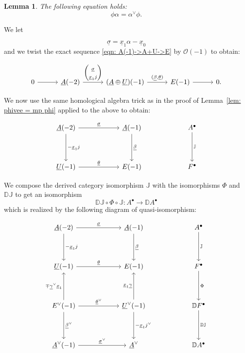 \documentclass{amsart}
\newtheorem{lemma}[theorem]{Lemma}
\theoremstyle{definition}
\newcommand{\DD} {{\mathbb D}}
\newcommand{\JJ} {{\mathbb J}}
\newcommand{\OO}{\mathcal{O}}
\newcommand{\UL}[1]{\underline{#1}}
\begin{document}
  
\begin{lemma}\label{lem: phi.alpha=alphavee.phi} The following
equation holds:
\[
\phi \alpha =\alpha^{\vee}\phi .
\]
\end{lemma}

\proof We let

\[
\UL{\sigma} = \UL{x}_{1}\alpha -\UL{x}_{0}
\]
and we twist the exact sequence \eqref{eqn: A(-1)->A+U->E} by $\OO
(-1)$ to obtain:

\[
\begin{tikzcd}[column sep=3em]
  0
    \arrow[r]
  & \UL{A}(-2)
    \arrow[r,"{%
      \begin{pmatrix}
        \UL{\sigma } \\
        \UL{x}_{1}j
      \end{pmatrix}
    }"]
  & (\UL{A}\oplus \UL{U})(-1)
    \arrow[r,"{(\UL{\beta},\UL{\theta})}"]
  & E(-1)
    \arrow[r]
  & 0.
\end{tikzcd}
\]

We now use the same homological algebra trick as in the proof of
Lemma~\ref{lem: phivee = mp phi} applied to the above to obtain:

\[
\begin{tikzcd}[column sep=6em,row sep=4em]
  \UL{A}(-2)
    \arrow[d,"-\UL{x}_{1}j"]
    \arrow[r,"\UL{\sigma  }"]
  & \UL{A}(-1)
    \arrow[d,"\UL{\beta }"]
  & A^{\bullet }
    \arrow[d,"\JJ "]
  \\
  \UL{U}(-1)
    \arrow[r,"\UL{\theta }"]
  & E(-1)
  & F^{\bullet}
\end{tikzcd}
\]

We compose the derived category isomorphism $\JJ$ with the
isomorphisms $\Phi$ and $\DD \JJ$ to get an isomorphism
\[
\DD \JJ \circ \Phi \circ \JJ :A^{\bullet}\longrightarrow \DD A^{\bullet }
\]
which is realized by the following diagram of quasi-isomorphism:

\begin{equation}\label{eqn: big diagram}
\begin{tikzcd}[column sep=6em,row sep=4em]
  \UL{A}(-2)
    \arrow[d,"-\UL{x}_{1}j"]
    \arrow[r,"\UL{\sigma  }"]
  & \UL{A}(-1)
    \arrow[d,"\UL{\beta }"]
  & A^{\bullet }
    \arrow[d,"\JJ "]
  \\
  \UL{U}(-1)
    \arrow[r,"\UL{\theta }"]
  & E(-1)
  & F^{\bullet}
    \arrow[d,"\Phi"]\\
  E^{\vee}(-1)
    \arrow[d,"\UL{\beta}^{\vee}"]
    \arrow[u,"\mp \UL{\gamma}^{\vee}\UL{x}_{1}"]
    \arrow[r,"\UL{\theta }^{\vee}"]
  & \UL{U}^{\vee }(-1)
    \arrow[d,"-\UL{x}_{1}j^{\vee}"]
    \arrow[u,"\UL{x}_{1}\UL{\gamma }"]
  & \DD F^{\bullet}
    \arrow[d,"\DD \JJ "]\\
    \UL{A}^{\vee}(-1) 
    \arrow[r,"\UL{\sigma  }^{\vee}"]
  & \UL{A}^{\vee }
  & \DD A^{\bullet} 
\end{tikzcd}
\end{equation}
\end{document}
